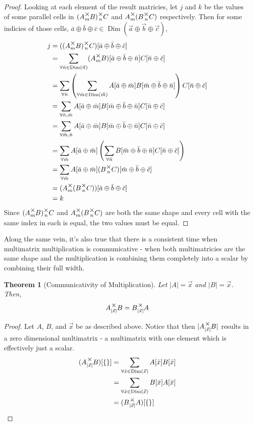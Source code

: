 \documentclass[12pt]{book}
\theoremstyle{plain}
\newtheorem{theorem}{Theorem}[chapter]
\theoremstyle{definition}
\theoremstyle{ppart}
\theoremstyle{case}
\theoremstyle{solution}
\DeclareMathOperator{\Dim}{Dim}
\newcommand{\mmult}[1]{\text{\raisebox{1ex}{$\underset{#1}{\times}$}}}
\begin{document}
\begin{proof}
Looking at each element of the result matricies, let $j$ and $k$ be the values
of some parallel cells in $(A \mmult{m} B) \mmult{n} C$ and
$A \mmult{m} (B \mmult{n} C)$ respectively. Then for some indicies of those cells,
$\bar{a} \oplus \bar{b} \oplus \bar{c} \in
\Dim(\vec{a} \oplus \vec{b} \oplus \vec{c})$,
\begin{align*}
 j
 &= ((A \mmult{m} B) \mmult{n} C)[\bar{a} \oplus \bar{b} \oplus \bar{c}] \\
 &= \sum_{\forall \bar{n} \in \Dim(\vec{n})}
 (A \mmult{m} B)[\bar{a} \oplus \bar{b} \oplus \bar{n}]
 C[\bar{n} \oplus \bar{c}] \\
 &= \sum_{\forall \bar{n}}
 \left(
  \sum_{\forall \bar{m} \in \Dim(\vec{m})}
  A[\bar{a} \oplus \bar{m}]B[\bar{m} \oplus \bar{b} \oplus \bar{n}]
 \right)
 C[\bar{n} \oplus \bar{c}] \\
 &= \sum_{\forall \bar{n}, \bar{m}}
 A[\bar{a} \oplus \bar{m}]
 B[\bar{m} \oplus \bar{b} \oplus \bar{n}]
 C[\bar{n} \oplus \bar{c}] \\
 &= \sum_{\forall \bar{m}, \bar{n}}
 A[\bar{a} \oplus \bar{m}]
 B[\bar{m} \oplus \bar{b} \oplus \bar{n}]
 C[\bar{n} \oplus \bar{c}] \\
 &= \sum_{\forall \bar{m}}
 A[\bar{a} \oplus \bar{m}]
 \left(
 \sum_{\forall \bar{n}}
  B[\bar{m} \oplus \bar{b} \oplus \bar{n}]
  C[\bar{n} \oplus \bar{c}]
 \right) \\
 &= \sum_{\forall \bar{m}}
 A[\bar{a} \oplus \bar{m}]
 (B \mmult{n} C)[\bar{m} \oplus \bar{b} \oplus \bar{c}] \\
 &= (A \mmult{m} (B \mmult{n} C))[\bar{a} \oplus \bar{b} \oplus \bar{c}] \\
 &= k
\end{align*}
Since $(A \mmult{m} B) \mmult{n} C$ and $A \mmult{m} (B \mmult{n} C)$ are both
the same shape and every cell with the same index in each is equal, the two
values must be equal.
\end{proof}

Along the same vein, it's also true that there is a consistent time when
multimatrix multiplication is communicative - when both multimatricies are
the same shape and the multiplication is combining them completely into a
scalar by combining their full width.

\begin{theorem}[Communicativity of Multiplication]
Let $|A| = \vec{x}$ and $|B| = \vec{x}$. Then,
\[ A \mmult{|\vec{x}|} B = B \mmult{|\vec{x}|} A \]
\end{theorem}
\begin{proof}
Let $A$, $B$, and $\vec{x}$ be as described above. Notice that then $|A \mmult{|\vec{x}|} B|$
results in a zero dimensional multimatrix - a multimatrix with one element which is effectively
just a scalar.
\begin{align*}
(A \mmult{|\vec{x}|} B)[\{\}]
  &= \sum_{\forall \bar{x} \in \Dim(\vec{x})} A[\bar{x}]B[\bar{x}] \\
  &= \sum_{\forall \bar{x} \in \Dim(\vec{x})} B[\bar{x}]A[\bar{x}] \\
  &= (B \mmult{|\vec{x}|} A)[\{\}]
\end{align*}
\end{proof}
\end{document}
